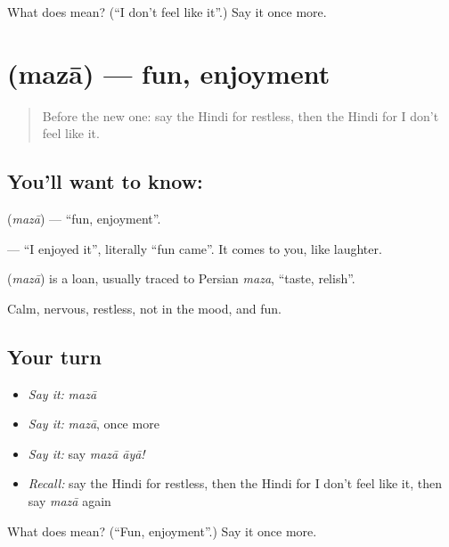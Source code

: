 \begin{tcolorbox}[breakable,colback=teal!4,colframe=teal!35!black,title={Before you move on}]
What does    mean? (\textquotedblleft{}I don't feel like it\textquotedblright{}.) Say it once more.
\end{tcolorbox}
\section[\texorpdfstring{\hi{मज़ा} (mazā)}{मज़ा (mazā)}]{ (mazā) — fun, enjoyment}

\label{lesson:HI-C125-maza}



\begin{quote}
Before the new one: say the Hindi for restless, then the Hindi for I don't feel like it.
\end{quote}

\subsection*{You'll want to know: }
\textbf{} (\emph{mazā}) — \textquotedblleft{}fun, enjoyment\textquotedblright{}.

\textbf{ } — \textquotedblleft{}I enjoyed it\textquotedblright{}, literally \textquotedblleft{}fun came\textquotedblright{}. It comes to you, like laughter.

\begin{cousinweb}
\textbf{} (\emph{mazā}) is a loan, usually traced to Persian \emph{maza}, \textquotedblleft{}taste, relish\textquotedblright{}.
\end{cousinweb}

\begin{grammarlens}[title={What you've built}]
Calm, nervous, restless, not in the mood, and fun.
\end{grammarlens}

\subsection*{Your turn}
\begin{itemize}
\raggedright
  \item \emph{Say it:} \emph{mazā}
  \item \emph{Say it:} \emph{mazā}, once more
  \item \emph{Say it:} say \emph{mazā āyā!}
  \item \emph{Recall:} say the Hindi for restless, then the Hindi for I don't feel like it, then say \emph{mazā} again
\end{itemize}

\begin{tcolorbox}[breakable,colback=teal!4,colframe=teal!35!black,title={Before you move on}]
What does  mean? (\textquotedblleft{}Fun, enjoyment\textquotedblright{}.) Say it once more.
\end{tcolorbox}
